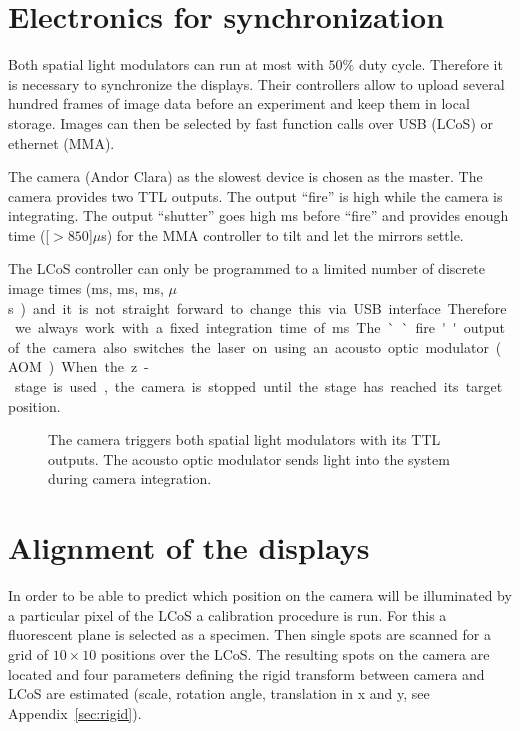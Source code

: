 \section{Electronics for synchronization}
Both spatial light modulators can run at most with $50\%$ duty
cycle. Therefore it is necessary to synchronize the displays. Their
controllers allow to upload several hundred frames of image data
before an experiment and keep them in local storage. Images can then
be selected by fast function calls over USB (LCoS) or ethernet (MMA).

The camera (Andor Clara) as the slowest device is chosen as the
master. The camera provides two TTL outputs. The output ``fire'' is
high while the camera is integrating. The output ``shutter'' goes high
\unit[1]{ms} before ``fire'' and provides enough time
(\unit[$>850$]{$\mu$s}) for the MMA controller to tilt and let the
mirrors settle.

The LCoS controller can only be programmed to a limited number of
discrete image times (\unit[20]{ms}, \unit[10]{ms}, \unit[5]{ms},
\unit[200]{$\mu$s}) and it is not straight forward to change this via
USB interface. Therefore we always work with a fixed integration time
of \unit[20]{ms}. The ``fire'' output of the camera also switches the
laser on using an acousto optic modulator (AOM).

When the z-stage is used, the camera is stopped until the stage has
reached its target position.

\begin{figure}[!hbt]
  \centering
  
  \caption{The camera triggers both spatial light modulators with its
    TTL outputs. The acousto optic modulator sends light into the
    system during camera integration.}
  \label{fig:memi-electronics}
\end{figure}

\section{Alignment of the displays}

In order to be able to predict which position on the camera will be
illuminated by a particular pixel of the LCoS a calibration procedure
is run. For this a fluorescent plane is selected as a specimen. Then
single spots are scanned for a grid of $10\times10$ positions over the
LCoS. The resulting spots on the camera are located and four
parameters defining the rigid transform between camera and LCoS are
estimated (scale, rotation angle, translation in x and y, see
Appendix~\ref{sec:rigid}).

